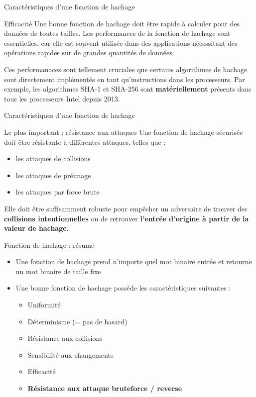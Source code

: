 \begin{frame}{Caractéristiques d'une fonction de hachage}
  \begin{block}{Efficacité}
    Une bonne fonction de hachage doit être rapide à calculer pour des données de toutes tailles.
    Les performances de la fonction de hachage sont essentielles, car elle est souvent utilisée dans des applications nécessitant des opérations rapides sur de grandes quantités de données.

    \vspace*{1em}

    Ces performanaces sont tellement cruciales que certains algorithmes de hachage sont directement implémentés en tant qu'instructions dans les processeurs.
    Par exemple, les algorithmes SHA-1 et SHA-256 sont \textbf{matériellement} présents dans tous les processeurs Intel depuis 2013.
  \end{block}
\end{frame}

\begin{frame}{Caractéristiques d'une fonction de hachage}
  \begin{block}{Le plus important : résistance aux attaques}
    Une fonction de hachage sécurisée doit être résistante à différentes attaques, telles que :

    \begin{itemize}
      \item les attaques de collisions
      \item les attaques de préimage
      \item les attaques par force brute
    \end{itemize}

    Elle doit être suffisamment robuste pour empêcher un adversaire de trouver des \textbf{collisions intentionnelles} ou de retrouver \textbf{l'entrée d'origine à partir de la valeur de hachage}.
  \end{block}
\end{frame}

\begin{frame}{Fonction de hachage : résumé}
  \begin{itemize}
    \item Une fonction de hachage prend n'importe quel mot binaire entrée et retourne un mot binaire de taille fixe
    \item Une bonne fonction de hachage possède les caractéristiques suivantes :
          \begin{itemize}
            \item Uniformité
            \item Déterminisme (= pas de hasard)
            \item Résistance aux collisions
            \item Sensibilité aux changements
            \item Efficacité
            \item \textbf{Résistance aux attaque bruteforce / reverse}
          \end{itemize}
  \end{itemize}
\end{frame}

